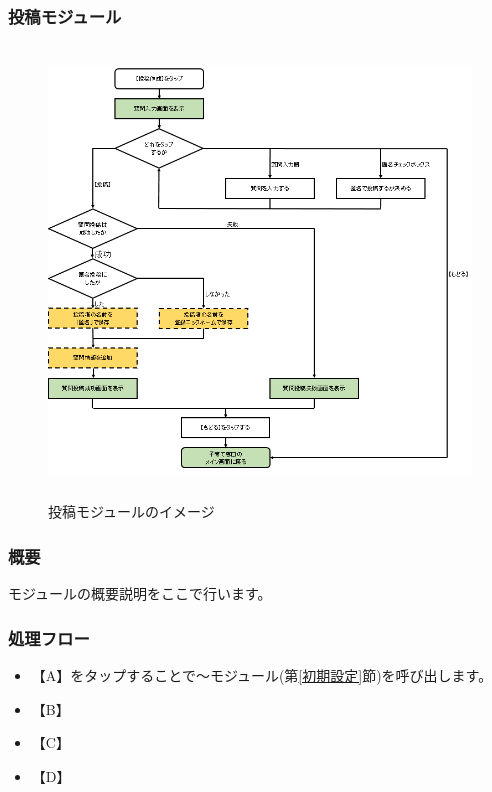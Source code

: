 \documentclass[a4j]{jarticle}
\begin{document}
\subsubsection{投稿モジュール\label{投稿}} %
\begin{figure}[H]
    \begin{center}
      \includegraphics[height = 12.0cm] {子育て窓口_投稿.PNG} %
    \caption {投稿モジュールのイメージ}
    \label{functionselection}
    \end{center}
\end{figure}
\subsubsection*{概要}
モジュールの概要説明をここで行います。
\subsubsection*{処理フロー}
\begin{itemize}
\item 【A】をタップすることで～モジュール(第\ref{初期設定}節)を呼び出します。%
\item 【B】
\item 【C】
\item 【D】
\end{itemize}
\end{document}
